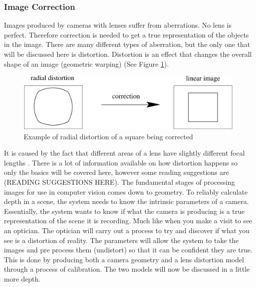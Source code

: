 \documentclass[11pt,oneside]{report}
\begin{document}
				\subsubsection{Image Correction}
				Images produced by cameras with lenses suffer from aberrations.
				No lens is perfect.
				Therefore correction is needed to get a true representation of the objects in the image.
				There are many different types of aberration, but the only one that will be discussed here is distortion.
				Distortion is an effect that changes the overall shape of an image (geometric warping) (See Figure \ref{distortion}).
				\begin{figure}[!h]
				\begin{center}
					
    					\includegraphics[scale=0.5]{distortion_1}
    					\caption{Example of radial distortion of a square being corrected \protect\cite{book:multiViewGeo} {\label{distortion}}}
    				\end{center}
				\end{figure}				
				It is caused by the fact that different areas of a lens have slightly different focal lengths \cite[p. 42]{book:modern}.
				There is a lot of information available on how distortion happens so only the basics will be covered here, however some reading suggestions are (READING SUGGESTIONS HERE).
				The fundamental stages of processing images for use in computer vision comes down to geometry.
				To reliably calculate depth in a scene, the system needs to know the intrinsic %
				parameters of a camera.
				Essentially, the system wants to know if what the camera is producing is a true representation of the scene it is recording.
				Much like when you make a visit to see an optician. 
				The optician will carry out a process to try and discover if what you see is a distortion of reality.
				The parameters will allow the system to take the images and pre process them (undistort) so that it can be confident they are true.
				This is done by producing both a camera geometry and a lens distortion model through a process of calibration.  
				The two models will now be discussed in a little more depth.				
\end{document}

